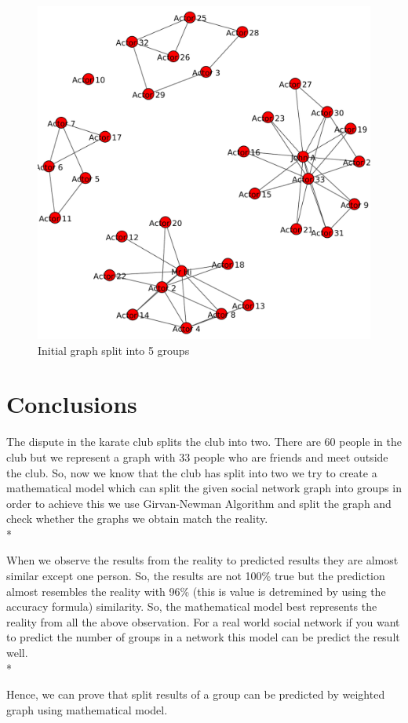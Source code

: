 \documentclass[12pt]{article}
\begin{document}
\begin{figure}[ht]
\includegraphics[scale=0.7]{../Q2/graph6.pdf}
\centering
\caption{Initial graph split into 5 groups}
\label{Initial graph split into 5 groups}
\end{figure}
\newpage

\section{Conclusions}
The dispute in the karate club splits the club into two. There are 60 people in the club but we represent a graph with 33 people who are friends and meet outside the club. So, now we know that the club has split into two we try to create a mathematical model which can split the given social network graph into groups in order to achieve this we use Girvan-Newman Algorithm and split the graph and check whether the graphs we obtain match the reality.\\*

When we observe the results from the reality to predicted results they are almost similar except one person. So, the results are not 100\% true but the prediction almost resembles the reality with 96\% (this is value is detremined by using the accuracy formula) similarity. So, the mathematical model best represents the reality from all the above observation. For a real world social network if you want to predict the number of groups in a network this model can be predict the result well.\\*

Hence, we can prove that split results of a group can be predicted by weighted graph using mathematical model.

\newpage


\cite{*}
\end{document}
